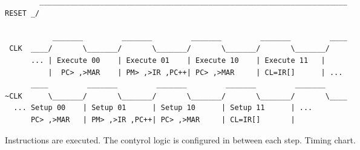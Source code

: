 \begin{figure*}[h!]
\begin{lstlisting}
        _______________________________________________________________________
RESET _/       

           _______         _______         _______         _______         ____
 CLK  ____/       \_______/       \_______/       \_______/       \_______/    
      ... | Execute 00    | Execute 01    | Execute 10    | Execute 11   |
          |  PC> ,>MAR    | PM> ,>IR ,PC++| PC> ,>MAR     | CL=IR[]      | ...
      ____         _______         _______         _______         _______     
~CLK      \_______/       \_______/       \_______/       \_______/       \____
  ... Setup 00    | Setup 01      | Setup 10      | Setup 11      | ...
      PC> ,>MAR   | PM> ,>IR ,PC++| PC> ,>MAR     | CL=IR[]       |
\end{lstlisting}
\caption[Timing chart]{Instructions are executed. The contyrol logic is configured in between each step. Timing chart.}
\end{figure*}

























